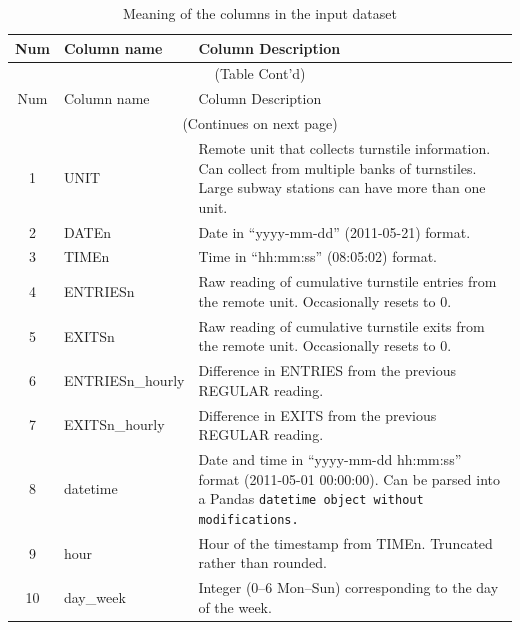 \documentclass{article}
\begin{document}
\begin{longtable}[h]{c|l|p{8cm}}

\hline
Num & Column name & Column Description \\[3pt]
\hline
\endfirsthead

\multicolumn{3}{c}{(Table Cont'd)}\\
\hline
Num & Column name & Column Description \\[3pt]
\hline

\endhead

\hline
\multicolumn{3}{c}{(Continues on next page)}\\
\endfoot


\hline
\caption{Meaning of the columns in the input dataset
\label{tab:col_meaning}}
\endlastfoot

 1 & UNIT & Remote unit that collects turnstile information. Can collect from multiple banks of turnstiles. Large subway stations can have more than one unit. \\[3pt]
 
2 & DATEn & Date in “yyyy-mm-dd” (2011-05-21) format. \\[3pt]

3 & TIMEn & Time in “hh:mm:ss” (08:05:02) format. \\[3pt]

4 & ENTRIESn & Raw reading of cumulative turnstile entries from the remote unit. Occasionally resets to 0. \\[3pt]

5 & EXITSn & Raw reading of cumulative turnstile exits from the remote unit. Occasionally resets to 0. \\[3pt]

6 & ENTRIESn\_hourly & Difference in ENTRIES from the previous REGULAR reading.\\[3pt] 

7 & EXITSn\_hourly & Difference in EXITS from the previous REGULAR reading. \\[3pt]

8 & datetime & Date and time in “yyyy-mm-dd hh:mm:ss” format (2011-05-01 00:00:00). Can be parsed into a Pandas \tt datetime \rm object without modifications. \\[3pt]

9 & hour & Hour of the timestamp from TIMEn. Truncated rather than rounded. \\[3pt]

10 & day\_week & Integer (0--6 Mon--Sun) corresponding to the day of the week. \\[3pt]


\end{longtable}
\end{document}
